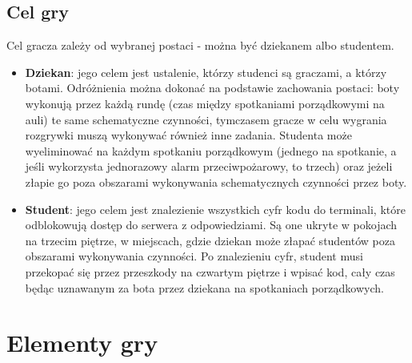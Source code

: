 \documentclass[]{report}
\begin{document}
\subsection{Cel gry}
Cel gracza zależy od wybranej postaci - można być dziekanem albo studentem.
\begin{itemize}
	\item \textbf{Dziekan}: jego celem jest ustalenie, którzy studenci są graczami, a którzy botami. Odróżnienia można dokonać na podstawie zachowania postaci: boty wykonują przez każdą rundę (czas między spotkaniami porządkowymi na auli) te same schematyczne czynności, tymczasem gracze w celu wygrania rozgrywki muszą wykonywać również inne zadania. Studenta może wyeliminować na każdym spotkaniu porządkowym (jednego na spotkanie, a jeśli wykorzysta jednorazowy alarm przeciwpożarowy, to trzech) oraz jeżeli złapie go poza obszarami wykonywania schematycznych czynności przez boty.
	\item \textbf{Student}: jego celem jest znalezienie wszystkich cyfr kodu do terminali, które odblokowują dostęp do serwera z odpowiedziami. Są one ukryte w pokojach na trzecim piętrze, w miejscach, gdzie dziekan może złapać studentów poza obszarami wykonywania czynności. Po znalezieniu cyfr, student musi przekopać się przez przeszkody na czwartym piętrze i wpisać kod, cały czas będąc uznawanym za bota przez dziekana na spotkaniach porządkowych.
\end{itemize}

\section{Elementy gry}
\end{document}
